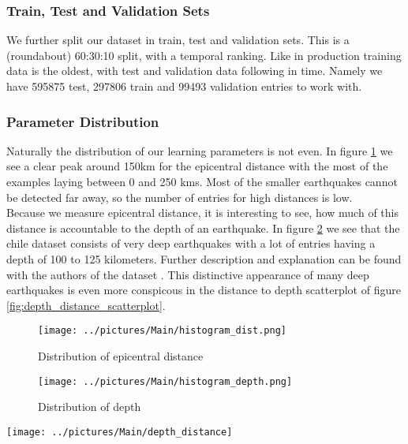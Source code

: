 \documentclass[thesis.tex]{subfiles}
\begin{document}
\subsubsection{Train, Test and Validation Sets}
We further split our dataset in train, test and validation sets. This is a (roundabout) 60:30:10 split, with a temporal ranking. Like in production training data is the oldest, with test and validation data following in time. Namely we have 595875 test, 297806 train and 99493 validation entries to work with.
\subsubsection{Parameter Distribution}
Naturally the distribution of our learning parameters is not even. In figure \ref{fig:distance_histogram} we see a clear peak around 150km for the epicentral distance  with the most of the examples laying between 0 and 250 kms. Most of the smaller earthquakes cannot be detected far away, so the number of entries for high distances is low.\\
Because we measure epicentral distance, it is interesting to see, how much of this distance is accountable to the depth of an earthquake. In figure \ref{fig:depth_histogram} we see that the chile dataset consists of very deep earthquakes with a lot of entries having a depth of 100 to 125 kilometers. Further description and explanation can be found with the authors of the dataset \cite{sippl2018seismicity}. This distinctive appearance of many deep earthquakes is even more conspicous in the distance to depth scatterplot of figure \ref{fig:depth_distance_scatterplot}.
\begin{figure*}[h!]
	\begin{subfigure}[b]{0.5\textwidth}
		\texttt{[image: ../pictures/Main/histogram\_dist.png]}
		\caption{Distribution of epicentral distance}
		\label{fig:distance_histogram}
	\end{subfigure}
	\hfill
	\begin{subfigure}[b]{0.5\textwidth}
			\texttt{[image: ../pictures/Main/histogram\_depth.png]}
		\caption{Distribution of depth}
		\label{fig:depth_histogram}
	\end{subfigure}
\caption{Histogram plots of epicentral distance and depth for the Chile dataset, each with 100 bins}
\end{figure*} 
\begin{figure*}[h]
	\centering
	\texttt{[image: ../pictures/Main/depth\_distance]}
	\caption{Distance and depth plotted against each other in a scatterplot. The dense areas are recognizable by a lighter and more radiant colour}
	\label{fig:depth_distance_scatterplot}
\end{figure*} 
\end{document}
